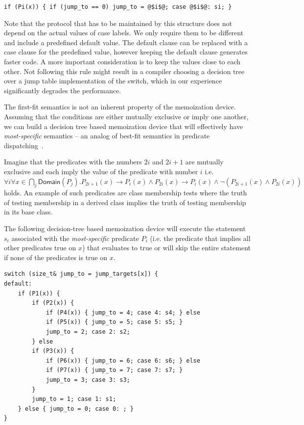\begin{lstlisting}
if (Pi(x)) { if (jump_to == 0) jump_to = @$i$@; case @$i$@: si; }
\end{lstlisting}

\noindent
Note that the protocol that has to be maintained by this structure does not 
depend on the actual values of case labels. We only require them to be 
different and include a predefined default value. The default clause can be 
replaced with a case clause for the predefined value, however keeping the default  
clause generates faster code. A more important consideration is to 
keep the values close to each other. Not following this rule might result in a 
compiler choosing a decision tree over a jump table implementation of the 
switch, which in our experience significantly degrades the performance.

The first-fit semantics is not an inherent property of the memoization device. 
Assuming that the conditions are either mutually exclusive or imply one another, we 
can build a decision tree based memoization device that will effectively have 
\emph{most-specific} semantics -- an analog of best-fit semantics in predicate 
dispatching~\cite{ErnstKC98}.

Imagine that the predicates with the numbers $2i$ and $2i+1$ are mutually exclusive and 
each imply the value of the predicate with number $i$ i.e.
$\forall i\forall x\in\bigcap_j\mathsf{Domain}(P_j).P_{2i+1}(x)\rightarrow P_i(x)\wedge P_{2i}(x)\rightarrow P_i(x)\wedge\neg(P_{2i+1}(x)\wedge P_{2i}(x))$ holds. 
An example of such predicates are class membership tests where the truth of 
testing membership in a derived class implies the truth of testing membership in 
its base class.

The following decision-tree based memoization device will execute the statement 
$s_i$ associated with the \emph{most-specific} predicate $P_i$ (i.e. the 
predicate that implies all other predicates true on $x$) that evaluates to true 
or will skip the entire statement if none of the predicates is true on $x$.

\begin{lstlisting}
switch (size_t& jump_to = jump_targets[x]) {
default:
    if (P1(x)) {
        if (P2(x)) {
            if (P4(x)) { jump_to = 4; case 4: s4; } else
            if (P5(x)) { jump_to = 5; case 5: s5; } 
            jump_to = 2; case 2: s2;
        } else
        if (P3(x)) {
            if (P6(x)) { jump_to = 6; case 6: s6; } else
            if (P7(x)) { jump_to = 7; case 7: s7; } 
            jump_to = 3; case 3: s3;
        }
        jump_to = 1; case 1: s1;
    } else { jump_to = 0; case 0: ; }
}
\end{lstlisting}

